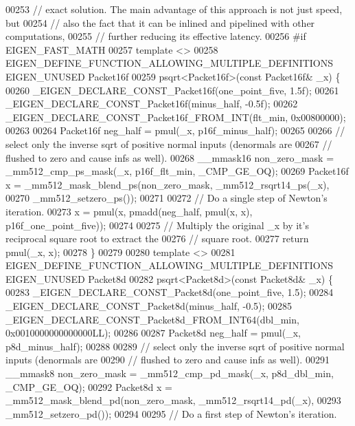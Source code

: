 \begin{DoxyCode}
00253 \textcolor{comment}{// exact solution. The main advantage of this approach is not just speed, but}
00254 \textcolor{comment}{// also the fact that it can be inlined and pipelined with other computations,}
00255 \textcolor{comment}{// further reducing its effective latency.}
00256 \textcolor{preprocessor}{#if EIGEN\_FAST\_MATH}
00257 \textcolor{keyword}{template} <>
00258 EIGEN\_DEFINE\_FUNCTION\_ALLOWING\_MULTIPLE\_DEFINITIONS EIGEN\_UNUSED Packet16f
00259 psqrt<Packet16f>(\textcolor{keyword}{const} Packet16f& \_x) \{
00260   \_EIGEN\_DECLARE\_CONST\_Packet16f(one\_point\_five, 1.5f);
00261   \_EIGEN\_DECLARE\_CONST\_Packet16f(minus\_half, -0.5f);
00262   \_EIGEN\_DECLARE\_CONST\_Packet16f\_FROM\_INT(flt\_min, 0x00800000);
00263 
00264   Packet16f neg\_half = pmul(\_x, p16f\_minus\_half);
00265 
00266   \textcolor{comment}{// select only the inverse sqrt of positive normal inputs (denormals are}
00267   \textcolor{comment}{// flushed to zero and cause infs as well).}
00268   \_\_mmask16 non\_zero\_mask = \_mm512\_cmp\_ps\_mask(\_x, p16f\_flt\_min, \_CMP\_GE\_OQ);
00269   Packet16f x = \_mm512\_mask\_blend\_ps(non\_zero\_mask, \_mm512\_rsqrt14\_ps(\_x),
00270                                      \_mm512\_setzero\_ps());
00271 
00272   \textcolor{comment}{// Do a single step of Newton's iteration.}
00273   x = pmul(x, pmadd(neg\_half, pmul(x, x), p16f\_one\_point\_five));
00274 
00275   \textcolor{comment}{// Multiply the original \_x by it's reciprocal square root to extract the}
00276   \textcolor{comment}{// square root.}
00277   \textcolor{keywordflow}{return} pmul(\_x, x);
00278 \}
00279 
00280 \textcolor{keyword}{template} <>
00281 EIGEN\_DEFINE\_FUNCTION\_ALLOWING\_MULTIPLE\_DEFINITIONS EIGEN\_UNUSED Packet8d
00282 psqrt<Packet8d>(\textcolor{keyword}{const} Packet8d& \_x) \{
00283   \_EIGEN\_DECLARE\_CONST\_Packet8d(one\_point\_five, 1.5);
00284   \_EIGEN\_DECLARE\_CONST\_Packet8d(minus\_half, -0.5);
00285   \_EIGEN\_DECLARE\_CONST\_Packet8d\_FROM\_INT64(dbl\_min, 0x0010000000000000LL);
00286 
00287   Packet8d neg\_half = pmul(\_x, p8d\_minus\_half);
00288 
00289   \textcolor{comment}{// select only the inverse sqrt of positive normal inputs (denormals are}
00290   \textcolor{comment}{// flushed to zero and cause infs as well).}
00291   \_\_mmask8 non\_zero\_mask = \_mm512\_cmp\_pd\_mask(\_x, p8d\_dbl\_min, \_CMP\_GE\_OQ);
00292   Packet8d x = \_mm512\_mask\_blend\_pd(non\_zero\_mask, \_mm512\_rsqrt14\_pd(\_x),
00293                                     \_mm512\_setzero\_pd());
00294 
00295   \textcolor{comment}{// Do a first step of Newton's iteration.}

\end{DoxyCode}
